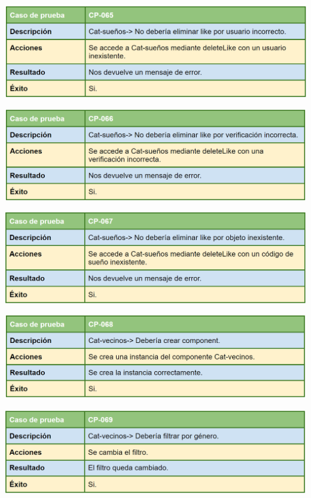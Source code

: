 \bigskip

\includegraphics[width=\textwidth]{img/cap7/cp-065.png}

\bigskip

\includegraphics[width=\textwidth]{img/cap7/cp-066.png}

\bigskip

\includegraphics[width=\textwidth]{img/cap7/cp-067.png}

\bigskip

\includegraphics[width=\textwidth]{img/cap7/cp-068.png}

\bigskip

\includegraphics[width=\textwidth]{img/cap7/cp-069.png}

